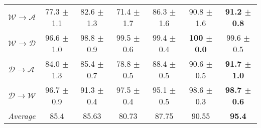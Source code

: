 \begin{table*}[t]
{\begin{tabular}{| l | c | c | c | c | c | c|}
{\sl $\mathcal{W} \rightarrow \mathcal{A}$} & 77.3 $\pm$ 1.1 & 82.6 $\pm$ 1.3 & 71.4 $\pm$ 1.7 & 86.3 $\pm$ 1.6 & 90.8 $\pm$ 1.6   & {\bf 91.2 $\pm$ 0.8}   \\
{\sl $\mathcal{W} \rightarrow \mathcal{D}$} & 96.6 $\pm$ 1.0 & 98.8 $\pm$ 0.9  & 99.5 $\pm$ 0.6 & 99.4 $\pm$ 0.4 & {\bf 100 $\pm$ 0.0}   & 99.6 $\pm$ 0.5   \\
{\sl $\mathcal{D} \rightarrow \mathcal{A}$} & 84.0 $\pm$ 1.3 & 85.4 $\pm$ 0.7  & 78.8 $\pm$ 0.5 & 88.4 $\pm$ 0.5 & 90.6 $\pm$ 0.5  & {\bf 91.7 $\pm$ 1.0}    \\
{\sl $\mathcal{D} \rightarrow \mathcal{W}$} & 96.7 $\pm$ 0.9  & 91.3 $\pm$ 0.4 & 97.5 $\pm$ 0.4 & 95.1 $\pm$ 0.5 & 98.6 $\pm$ 0.3  & {\bf 98.7 $\pm$ 0.6}   \\
\hline
{\sl Average}  & 85.4 & 85.63 & 80.73 & 87.75 & 90.55   & {\bf 95.4}   \\
\hline
    \end{tabular}}
\end{table*}



\begin{table}[t]
\caption{\textbf{MNIST-USPS datasets.} Classification accuracy for domain adaptation over the MNIST and USPS datasets. $\mathcal{M}$ and $\mathcal{U}$ stand for MNIST and USPS domain. {\tt Lower Bound} is our base model without adaptation. {\tt \modelDA- $n$} stands for our method when we use $n$ labeled target samples per category in training.}
\label{tab-MNIST-USPS}
\centering
{}
\end{table}



